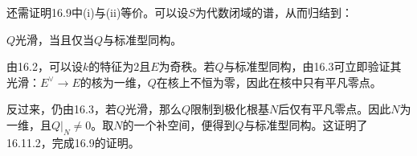 还需证明16.9中(i)与(ii)等价。可以设$S$为代数闭域的谱，从而归结到：
 
$Q$光滑，当且仅当$Q$与标准型同构。

由16.2，可以设$k$的特征为$2$且$E$为奇秩。若$Q$与标准型同构，由16.3可立即验证其光滑：$E^\vee\to E$的核为一维，$Q$在核上不恒为零，因此在核中只有平凡零点。

反过来，仍由16.3，若$Q$光滑，那么$Q$限制到极化根基$N$后仅有平凡零点。因此$N$为一维，且$Q|_N\ne0$。取$N$的一个补空间，便得到$Q$与标准型同构。这证明了16.11.2，完成16.9的证明。
\par\endgroup
